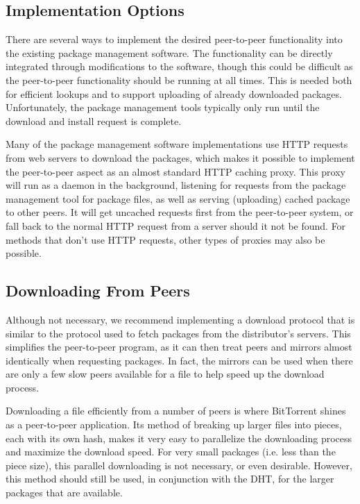 \documentclass[conference]{IEEEtran}
\begin{document}
\subsection{Implementation Options}
\label{imp_options}

There are several ways to implement the desired peer-to-peer functionality
into the existing package management software. The functionality can
be directly integrated through modifications to the software, though
this could be difficult as the peer-to-peer functionality should be running
at all times. This is needed both for efficient lookups and to
support uploading of already downloaded packages. Unfortunately, the
package management tools typically only run until the download and
install request is complete.

Many of the package management software implementations use HTTP
requests from web servers to download the packages, which makes it
possible to implement the peer-to-peer aspect as an almost standard HTTP
caching proxy. This proxy will run as a daemon in the background,
listening for requests from the package management tool for package
files, as well as serving (uploading) cached package to other peers.
It will get uncached requests first from the peer-to-peer system, or
fall back to the normal HTTP request from a server should it not
be found. For methods that don't use HTTP requests, other types of
proxies may also be possible.

\subsection{Downloading From Peers}
\label{downloading}

Although not necessary, we recommend implementing a download
protocol that is similar to the protocol used to fetch packages from
the distributor's servers. This simplifies the peer-to-peer program, as it
can then treat peers and mirrors almost identically when requesting
packages. In fact, the mirrors can be used when there are only a few
slow peers available for a file to help speed up the download
process.

Downloading a file efficiently from a number of peers is where
BitTorrent shines as a peer-to-peer application. Its method of
breaking up larger files into pieces, each with its own hash,
makes it very easy to parallelize the downloading process and
maximize the download speed. For very small packages (i.e. less than
the piece size), this parallel downloading is not necessary, or
even desirable. However, this method should still be used, in
conjunction with the DHT, for the larger packages that are
available.
\end{document}
